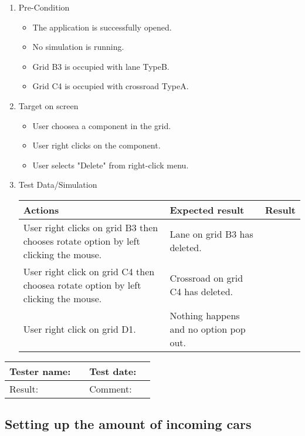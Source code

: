 \begin{enumerate}
	\item Pre-Condition
	\begin{itemize}
		\item The application is successfully opened.
		\item No simulation is running.
		\item Grid B3 is occupied with lane TypeB.
		\item Grid C4 is occupied with crossroad TypeA.
	\end{itemize}
	\item Target on screen
	\begin{itemize}
		\item User choosea a component in the grid.
		\item User right clicks on the component.
		\item User selects "Delete" from right-click menu.
	\end{itemize}
	\item Test Data/Simulation
	
	\begin{tabularx}{\textwidth}{|X|X|p{2.5cm}|}\hline
		Actions & Expected result & Result \\\hline
		User right clicks on grid B3 then chooses rotate option by left clicking the mouse.  & Lane on grid B3 has deleted.  & \pass \\\hline
		User right click on grid C4 then choosea rotate option by left clicking the mouse. & Crossroad on grid C4 has deleted. & \pass \\\hline
		User right click on grid D1. & Nothing happens and no option pop out. & \pass \\\hline
	\end{tabularx}
	
\end{enumerate}

\begin{tabularx}{\textwidth}{|p{3cm}X|p{3cm}X|}\hline
	Tester name: &  & Test date: & \\\hline
	Result: &   \pass & Comment: & \\\hline
\end{tabularx}

\newpage

\subsection{Setting up the amount of incoming cars }

